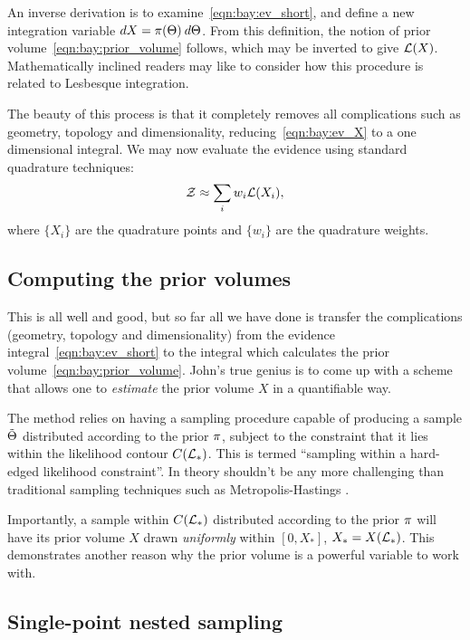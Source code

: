 An inverse derivation is to examine~\eqref{eqn:bay:ev_short}, and define a new integration variable $dX = \pi(\Theta)\:d\Theta$. From this definition, the notion of prior volume~\eqref{eqn:bay:prior_volume} follows, which may be inverted to give $\mathcal{L}(X)$. Mathematically inclined readers may like to consider how this procedure is related to Lesbesque integration.

The beauty of this process is that it completely removes all complications such as geometry, topology and dimensionality, reducing~\eqref{eqn:bay:ev_X} to a one dimensional integral.  We may now evaluate the evidence using standard quadrature techniques:
\begin{equation}
  \mathcal{Z} \approx \sum_{i} w_i \mathcal{L}(X_i),
  \label{eqn:bay:quadrature}
\end{equation}
where $\{X_i\}$ are the quadrature points and $\{w_i\}$ are the quadrature weights. 

\subsection{Computing the prior volumes}

This is all well and good, but so far all we have done is transfer the complications (geometry, topology and dimensionality) from the evidence integral~\eqref{eqn:bay:ev_short} to the integral which calculates the prior volume~\eqref{eqn:bay:prior_volume}. John's true genius is to come up with a scheme that allows one to {\em estimate\/} the prior volume $X$ in a quantifiable way.

The method relies on having a sampling procedure capable of producing a sample $\tilde{\Theta}$ distributed according to the prior $\pi$, subject to the constraint that it lies within the likelihood contour $C(\mathcal{L}_\ast)$.  This is termed ``sampling within a hard-edged likelihood constraint''.  In theory shouldn't be any more challenging than traditional sampling techniques such as Metropolis-Hastings \citep{skilling2006}. 

Importantly, a sample within $C(\mathcal{L}_\ast)$ distributed according to the prior $\pi$ will have its prior volume $X$ drawn {\em uniformly\/} within $[0,X_\ast]$, $X_\ast=X(\mathcal{L}_\ast)$. This demonstrates another reason why the prior volume is a powerful variable to work with.

\subsection{Single-point nested sampling}

